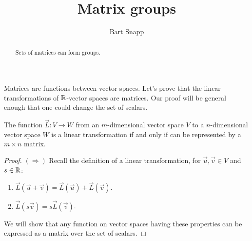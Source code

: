 \documentclass{ximera}
\author{Bart Snapp}
\title{Matrix groups}
\begin{document}
\begin{abstract}
  Sets of matrices can form groups.
\end{abstract}
\maketitle

Matrices are functions between vector spaces. Let's prove that the
linear transformations of $\mathbb R$-vector spaces are matrices. Our proof
will be general enough that one could change the set of scalars.

\begin{lemma}
  The function $\vec{L}: V \to W$ from an $m$-dimensional vector space
  $V$ to a $n$-dimensional vector space $W$ is a linear transformation
  if and only if can be represented by a $m\times n$ matrix.
  \begin{proof}
    $(\Rightarrow)$ Recall the definition of a linear transformation,
    for $\vec{u},\vec{v}\in V$ and $s\in \mathbb R$:
    \begin{enumerate}
    \item $\vec{L}(\vec{u}+\vec{v}) = \vec{L}(\vec{u})+\vec{L}(\vec{v})$.
    \item $\vec{L}(s \vec{v}) = s\vec{L}(\vec{v})$.
    \end{enumerate}
    We will show that any function on vector spaces having these
    properties can be expressed as a matrix over the set of scalars.


\end{proof}
\end{lemma}
\end{document}

